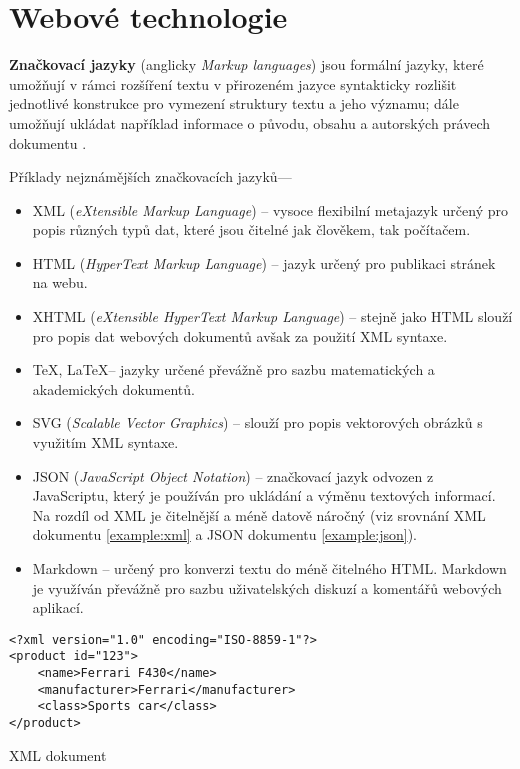 \chapter{Webové technologie}
\label{chap:languages}

\textbf{Značkovací jazyky} (anglicky \textit{Markup languages}) jsou formální jazyky, které umožňují v rámci rozšíření textu v přirozeném jazyce syntakticky rozlišit jednotlivé konstrukce pro vymezení struktury textu a jeho významu; dále umožňují ukládat například informace o původu, obsahu a autorských právech dokumentu \cite{modern-markup}.

Příklady nejznámějších značkovacích jazyků---

\begin{itemize}
    \item XML (\textit{eXtensible Markup Language}) -- vysoce flexibilní metajazyk určený pro popis různých typů dat, které jsou čitelné jak člověkem, tak počítačem.
    \item HTML (\textit{HyperText Markup Language}) -- jazyk určený pro publikaci stránek na webu.
    \item XHTML (\textit{eXtensible HyperText Markup Language}) -- stejně jako HTML slouží pro popis dat webových dokumentů avšak za použití XML syntaxe.
    \item \TeX, \LaTeX -- jazyky určené převážně pro sazbu matematických a akademických dokumentů.
    \item SVG (\textit{Scalable Vector Graphics}) -- slouží pro popis vektorových obrázků s využitím XML syntaxe.
    \item JSON (\textit{JavaScript Object Notation}) -- značkovací jazyk odvozen z JavaScriptu, který je používán pro ukládání a výměnu textových informací. Na rozdíl od XML je čitelnější a méně datově náročný (viz srovnání XML dokumentu \ref{example:xml} a JSON dokumentu \ref{example:json}).
    \item Markdown -- určený pro konverzi textu do méně čitelného HTML. Markdown je využíván převážně pro sazbu uživatelských diskuzí a komentářů webových aplikací.
\end{itemize}

\begin{example}
    \centering
    \begin{lstlisting}
<?xml version="1.0" encoding="ISO-8859-1"?>
<product id="123">
    <name>Ferrari F430</name>
    <manufacturer>Ferrari</manufacturer>
    <class>Sports car</class>
</product>
    \end{lstlisting}
    \caption{XML dokument}
    \label{example:xml}
\end{example}

